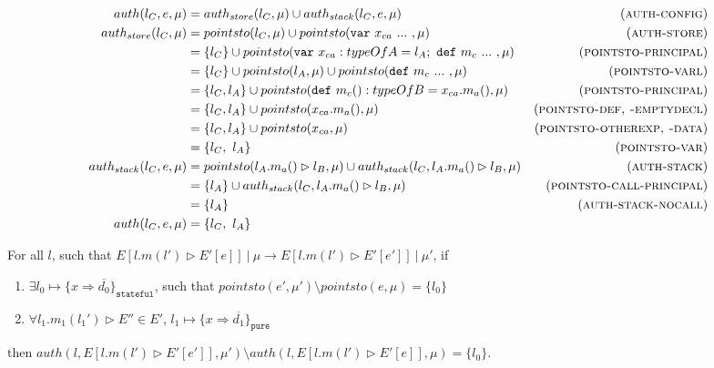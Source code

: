 \documentclass{llncs}
\newcommand{\keywadj}[1]{\mathtt{#1}}
\newcommand{\keyw}[1]{\keywadj{#1}~}
\begin{document}
\begin{align*}
auth(l_C, e, \mu) &= auth_{store}(l_C, \mu) \cup auth_{stack}(l_C, e, \mu) & (\textsc{auth-config})\\
auth_{store}(l_C, \mu) &= pointsto(l_C, \mu) \cup pointsto(\keyw{var} x_{ca}~...~, \mu) & (\textsc{auth-store})\\
 &= \{ l_C \} \cup pointsto(\keyw{var} x_{ca} : typeOfA = l_A;~\keyw{def} m_c~...~, \mu) & (\textsc{pointsto-principal})\\
 &= \{ l_C \} \cup pointsto(l_A, \mu) \cup pointsto(\keyw{def} m_c~...~, \mu) & (\textsc{pointsto-varl})\\
 &= \{ l_C, l_A \} \cup pointsto(\keyw{def} m_c() : typeOfB = x_{ca}.m_a(), \mu) & (\textsc{pointsto-principal})\\
 &= \{ l_C, l_A \} \cup pointsto(x_{ca}.m_a(), \mu) & (\textsc{pointsto-def, -emptydecl})\\
 &= \{ l_C, l_A \} \cup pointsto(x_{ca}, \mu) & (\textsc{pointsto-otherexp, -data})\\
 &= \{ l_C,~l_A \} & (\textsc{pointsto-var})\\
auth_{stack}(l_C, e, \mu) &= pointsto(l_A.m_a() \rhd l_B, \mu) \cup auth_{stack}(l_C, l_A.m_a() \rhd l_B, \mu) & (\textsc{auth-stack})\\
 &= \{ l_A \} \cup auth_{stack}(l_C, l_A.m_a() \rhd l_B, \mu) & (\textsc{pointsto-call-principal})\\
 &= \{ l_A \} & (\textsc{auth-stack-nocall})\\
auth(l_C, e, \mu) &=  \{ l_C,~l_A\}&\\
\end{align*}


\newpage

\begin{theorem}[Auxiliary]
For all $l$, such that
$E[l.m(l') \rhd E'[e]]~|~\mu \longrightarrow E[l.m(l') \rhd E'[e']]~|~\mu'$,
if
\begin{enumerate}
\item $\exists l_0 \mapsto \{ x \Rightarrow \overline{d_0} \}_{\keywadj{stateful}}$, such that $pointsto(e', \mu') \setminus pointsto(e, \mu) = \{ l_0 \}$
\item $\forall l_1.m_1(l_1') \rhd E'' \in E'$, $l_1 \mapsto \{ x \Rightarrow \overline{d_1} \}_{\keyw{pure}}$
\end{enumerate}
then
$auth(l, E[l.m(l') \rhd E'[e']], \mu') \setminus auth(l, E[l.m(l') \rhd E'[e]], \mu) = \{ l_0 \}$.
\end{theorem}
\end{document}
